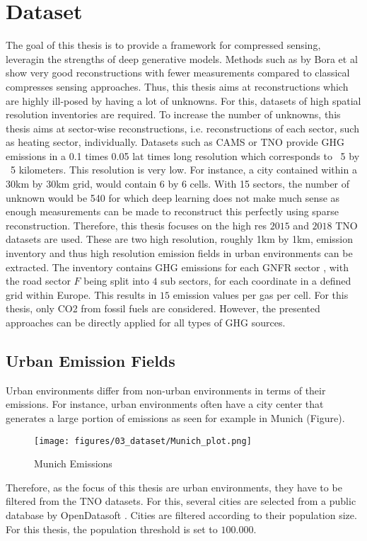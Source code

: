 
\chapter{Dataset}\label{chapter:dataset}

The goal of this thesis is to provide a framework for compressed sensing, leveragin the strengths of deep generative models.
Methods such as by Bora et al \parencite{CSUsingAI} show very good reconstructions with fewer measurements compared to classical compresses sensing approaches.
Thus, this thesis aims at reconstructions which are highly ill-posed by having a lot of unknowns.
For this, datasets of high spatial resolution inventories are required.
To increase the number of unknowns, this thesis aims at sector-wise reconstructions, i.e. reconstructions of each sector, such as heating sector, individually.
Datasets such as CAMS \parencite{CAMS} or TNO \parencite{TNO_LowRes}  provide GHG emissions in a 0.1 times 0.05 lat times long resolution which corresponds to ~5 by ~5 kilometers.
This resolution is very low.
For instance, a city contained within a 30km by 30km grid, would contain 6 by 6 cells.
With 15 sectors, the number of unknown would be 540 for which deep learning does not make much sense as enough measurements can be made to reconstruct this perfectly using sparse reconstruction.
Therefore, this thesis focuses on the high res $2015$ \parencite{TNO_HighRes15} and $2018$ \parencite{TNO_HighRes18} TNO datasets are used.
These are two high resolution, roughly 1km by 1km, emission inventory and thus high resolution emission fields in urban environments can be extracted.
The inventory contains GHG emissions for each GNFR sector \parencite{GNFR_Sectors}, with the road sector $F$ being split into $4$ sub sectors, for each coordinate in a defined grid within Europe.
This results in $15$ emission values per gas per cell.
For this thesis, only CO2 from fossil fuels are considered.
However, the presented approaches can be directly applied for all types of GHG sources.

\section{Urban Emission Fields}
Urban environments differ from non-urban environments in terms of their emissions.
For instance, urban environments often have a city center that generates a large portion of emissions as seen for example in Munich (Figure).
\begin{figure}[h!]
    \centering
    \texttt{[image: figures/03\_dataset/Munich\_plot.png]}
    \caption{Munich Emissions}
\end{figure}
Therefore, as the focus of this thesis are urban environments, they have to be filtered from the TNO datasets.
For this, several cities are selected from a public database by OpenDatasoft \parencite{OpenDataSoft}.
Cities are filtered according to their population size.
For this thesis, the population threshold is set to $100.000$.

